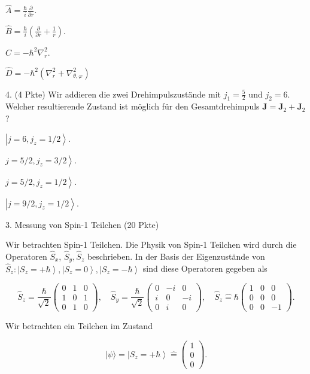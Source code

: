 \documentclass[11pt,a4paper]{article}
\begin{document}
$\hat{A}=\frac{\hbar}{i} \frac{\partial}{\partial r}$.

$\hat{B}=\frac{\hbar}{i}\left(\frac{\partial}{\partial r}+\frac{1}{r}\right)$.

$C=-\hbar^2 \nabla_r^2$.

$\hat{D}=-\hbar^2\left(\nabla_r^2+\nabla_{\theta, \varphi}^2\right)$

4. (4 Pkte) Wir addieren die zwei Drehimpulszustände mit $j_1=\frac{5}{2}$ und $j_2=6$. Welcher resultierende Zustand ist möglich für den Gesamtdrehimpuls $\mathbf{J}=\mathbf{J}_2+\mathbf{J}_2$ ?

$\left|j=6, j_z=1 / 2\right\rangle$.

$\left.j=5 / 2, j_z=3 / 2\right\rangle$.

$\left.j=5 / 2, j_z=1 / 2\right\rangle$.

$\left|j=9 / 2, j_z=1 / 2\right\rangle$.



3. Messung von Spin-1 Teilchen (20 Pkte)

Wir betrachten Spin-1 Teilchen. Die Physik von Spin-1 Teilchen wird durch die Operatoren $\hat{S}_x$, $\hat{S}_y, \hat{S}_z$ beschrieben. In der Basis der Eigenzustănde von $\hat{S}_z:\left|S_z=+\hbar\right\rangle,\left|S_z=0\right\rangle,\left|S_z=-\hbar\right\rangle$ sind diese Operatoren gegeben als

$$
\hat{S}_z=\frac{\hbar}{\sqrt{2}}\left(\begin{array}{lll}
0 & 1 & 0 \\
1 & 0 & 1 \\
0 & 1 & 0
\end{array}\right), \quad \hat{S}_y=\frac{\hbar}{\sqrt{2}}\left(\begin{array}{ccc}
0 & -i & 0 \\
i & 0 & -i \\
0 & i & 0
\end{array}\right), \quad \hat{S}_z \hat{=} \hbar\left(\begin{array}{ccc}
1 & 0 & 0 \\
0 & 0 & 0 \\
0 & 0 & -1
\end{array}\right) .
$$


Wir betrachten ein Teilchen im Zustand

$$
|\psi\rangle=\left|S_z=+\hbar\right\rangle \hat{=}\left(\begin{array}{l}
1 \\
0 \\
0
\end{array}\right) .
$$
\end{document}
